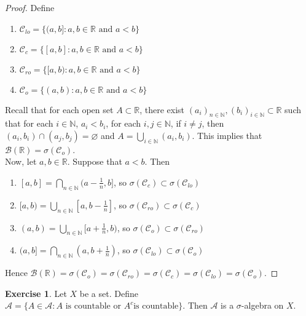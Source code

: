 \documentclass[12pt]{amsart}
\theoremstyle{definition}
\newtheorem{ex}[definition]{Exercise}
\newcommand{\sig}{\sigma}
\newcommand{\N}{\mathbb{N}}
\newcommand{\R}{\mathbb{R}}
\newcommand{\MA}{\mathcal{A}}
\newcommand{\MC}{\mathcal{C}}
\newcommand{\MB}{\mathcal{B}}
\newcommand{\lex}[1]{\label{ex:#1}}
\begin{document}
	\begin{proof}
		Define 
		\begin{enumerate}
			\item $\MC_{lo} = \{(a,b]:a,b \in \R \text{ and } a<b\}$\\
			\item $\MC_{c} = \{[a,b]:a,b \in \R \text{ and } a<b\}$\\
			\item $\MC_{ro} = \{[a,b):a,b \in \R \text{ and } a<b\}$\\
			\item $\MC_{o} = \{(a,b):a,b \in \R \text{ and } a<b\}$\\
		\end{enumerate} 
		Recall that for each open set $A \subset \R$, there exist $(a_i)_{n \in \N}, (b_i)_{i \in \N} \subset \R$ such that for each $i \in \N$, $a_i < b_i$, for each $i,j \in \N$, if $i \neq j$, then $(a_i,b_i) \cap (a_j, b_j) = \varnothing$ and $A = \bigcup\limits_{i \in \N}(a_i, b_i)$. This implies that $\MB(\R) = \sig(\MC_o)$. \vspace{2mm}\\
		Now, let $a,b \in \R$. Suppose that $a<b$. Then 
		\begin{enumerate}
			\item $[a,b] = \bigcap\limits_{n \in \N}(a- \frac{1}{n}, b]$, so $\sig(\MC_{c}) \subset \sig(\MC_{lo})$\\
			\item $[a,b) = \bigcup\limits_{n \in \N} [a,b-\frac{1}{n}]$, so $\sig(\MC_{ro}) \subset \sig(\MC_{c})$ \\
			\item $(a,b) = \bigcup\limits_{n \in \N} [a+\frac{1}{n},b)$, so $\sig(\MC_{o}) \subset \sig(\MC_{ro})$\\
			\item $(a,b] = \bigcap\limits_{n \in \N} (a,b+\frac{1}{n})$, so $\sig(\MC_{lo}) \subset \sig(\MC_{o})$\\
		\end{enumerate}
		Hence $\MB(\R) = \sig(\MC_o) = \sig(\MC_{ro}) = \sig(\MC_{c}) = \sig(\MC_{lo}) = \sig(\MC_{o})$. 
	\end{proof}
	
	\begin{ex} \lex{00000} 
		Let $X$ be a set. Define $\MA = \{A \in \MA: A \text{ is countable or }A^c  \text{is countable}\}$. Then $\MA$ is a $\sig$-algebra on $X$.
	\end{ex}
	
\end{document}
